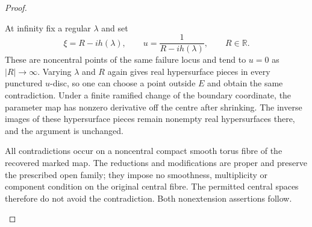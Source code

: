 \begin{proof}
\begin{enumerate}[label=\arabic*.]
At infinity fix a regular $\lambda$ and set
\[
 \xi=R-i h(\lambda),\qquad
 u=\frac1{R-i h(\lambda)},\qquad R\in\mathbb R.
\]
These are noncentral points of the same failure locus and
tend to $u=0$ as $|R|\to\infty$.  Varying $\lambda$ and $R$
again gives real hypersurface pieces in every punctured
$u$-disc, so one can choose a point outside $E$ and obtain the
same contradiction.  Under a finite ramified change of the
boundary coordinate, the parameter map has nonzero derivative
off the centre after shrinking.  The inverse images of these
hypersurface pieces remain nonempty real hypersurfaces there,
and the argument is unchanged.

All contradictions occur on a noncentral compact smooth
torus fibre of the recovered marked map.  The reductions and
modifications are proper and preserve the prescribed open
family; they impose no smoothness, multiplicity or component
condition on the original central fibre.  The permitted
central spaces therefore do not avoid the contradiction.
Both nonextension assertions follow.
\end{enumerate}
\end{proof}




